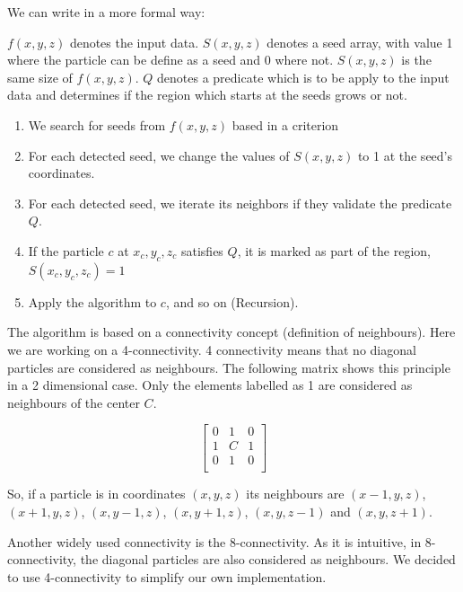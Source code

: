 \documentclass[12pt]{article}
\begin{document}
\begin{par}
We can write in a more formal way:
\end{par}

\begin{par}
$f(x,y,z)$ denotes the input data. $S(x,y,z)$ denotes a seed array, with
value 1 where the particle can be define as a seed and 0 where not. $S(x,y,z)$ is the
same size of $f(x,y,z)$. $Q$ denotes a predicate which is to be apply to the
input data and determines if the region which
 starts at the seeds grows or
not. 
\end{par}

\begin{enumerate}
	\item We search for seeds from $f(x,y,z)$ based in a criterion
	\item For each detected seed, we change the values of $S(x,y,z)$ to 1 at the seed's coordinates.
	\item For each detected seed, we iterate its neighbors if they validate the predicate $Q$.
    \item If the particle $c$ at $x_c, y_c, z_c$ satisfies $Q$, it is marked as part of the region, $S(x_c, y_c, z_c) = 1$
    \item Apply the algorithm to $c$, and so on
     (Recursion).
\end{enumerate}

\begin{par}
The algorithm is based on a connectivity concept (definition of
neighbours). Here we are working on a 4-connectivity. 4
connectivity means that no diagonal particles are considered as
neighbours. The following matrix shows this principle in a 2
dimensional case. Only the elements labelled as 1 are considered as
neighbours of the center $C$.
\end{par}

\[ 
\begin{bmatrix} 
    0 & 1 & 0 \\
    1 & C & 1 \\
    0 & 1 & 0\\
\end{bmatrix} 
\]

\begin{par}
So, if a particle is in coordinates $(x,y,z)$ its neighbours are
$(x-1,y,z)$, $(x+1,y,z)$, $(x,y-1,z)$, $(x,y+1,z)$, $(x,y,z-1)$
and $(x,y,z+1)$.
\end{par}

\begin{par}
Another widely used connectivity is the 8-connectivity. As it is
intuitive, in 8-connectivity, the diagonal particles are also
considered as neighbours. We decided to use 4-connectivity to
simplify our own implementation.
\end{par}
\end{document}
